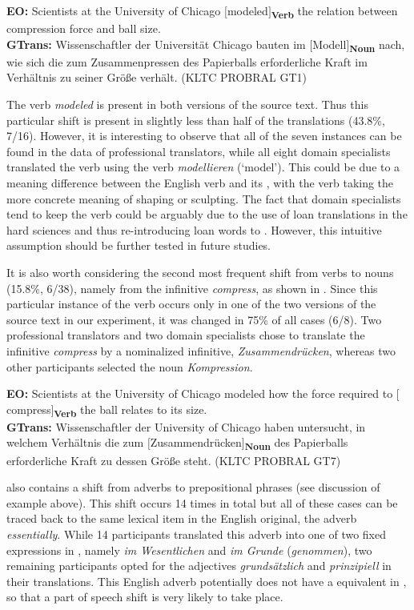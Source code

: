 \documentclass[output=paper]{LSP/langsci}
\begin{document}
\ea \label{serbinaetal:ex:8}
\textbf{EO:} Scientists at the University of Chicago $[$modeled$]$\textsubscript{\textbf{Verb} }the relation between compression force and ball size.\\
\textbf{GTrans:} Wissenschaftler der Universität Chicago bauten im $[$Modell$]$\textsubscript{\textbf{Noun}} nach, wie sich die zum Zusammenpressen des Papierballs erforderliche Kraft im Verhältnis zu seiner Größe verhält. (KLTC PROBRAL GT1)
\z 

The verb \textit{modeled} is present in both versions of the source text. Thus this particular shift is present in slightly less than half of the translations (43.8\%, 7/16). However, it is interesting to observe that all of the seven instances can be found in the data of professional translators, while all eight domain specialists translated the verb using the  verb \textit{modellieren} (`model'). This could be due to a meaning difference between the English verb and its  , with the  verb taking the more concrete meaning of shaping or sculpting. The fact that domain specialists tend to keep the verb could be arguably due to the use of loan translations in the hard sciences and thus re-introducing loan words to . However, this intuitive assumption should be further tested in future studies.

It is also worth considering the second most frequent shift from verbs to nouns (15.8\%, 6/38), namely from the infinitive \textit{compress}, as shown in . Since this particular instance of the verb occurs only in one of the two versions of the source text in our experiment, it was changed in 75\% of all cases (6/8). Two professional translators and two domain specialists chose to translate the infinitive \textit{compress} by a nominalized infinitive, \textit{Zusammendrücken}, whereas two other participants selected the noun \textit{Kompression}.  

\ea \label{serbinaetal:ex:9}
\textbf{EO:} Scientists at the University of Chicago modeled how the force required to $[$compress$]$\textsubscript{\textbf{Verb}} the ball relates to its size. \\
\textbf{GTrans:} Wissenschaftler der University of Chicago haben untersucht, in welchem Verhältnis die zum $[$Zusammendrücken$]$\textsubscript{\textbf{Noun}} des Papierballs erforderliche Kraft zu dessen Größe steht. (KLTC PROBRAL GT7) 
\z 

 also contains a shift from adverbs to prepositional phrases (see discussion of example  above). This shift occurs 14 times in total but all of these cases can be traced back to the same lexical item in the English original, the adverb \textit{essentially}. While 14 participants translated this adverb into one of two fixed expressions in , namely \textit{im Wesentlichen} and \textit{im Grunde} (\textit{genommen}), two remaining participants opted for the adjectives \textit{grundsätzlich} and \textit{prinzipiell} in their translations. This English adverb potentially does not have a  equivalent in , so that a part of speech shift is very likely to take place. 
\end{document}
